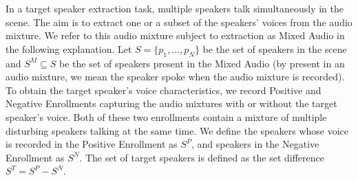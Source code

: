 




In a target speaker extraction task, multiple speakers talk simultaneously in the scene. The aim is to extract one or a subset of the speakers' voices from the audio mixture. We refer to this audio mixture subject to extraction as Mixed Audio in the following explanation. Let $S = \{p_1, ..., p_N\}$ be the set of speakers in the scene and $S^M \subseteq S$ be the set of speakers present in the Mixed Audio (by present in an audio mixture, we mean the speaker spoke when the audio mixture is recorded). To obtain the target speaker's voice characteristics, we record Positive and Negative Enrollments capturing the audio mixtures with or without the target speaker's voice. Both of these two enrollments contain a mixture of multiple disturbing speakers talking at the same time. We define the speakers whose voice is recorded in the Positive Enrollment as $S^P$, and speakers in the Negative Enrollment as $S^N$. The set of target speakers is defined as the set difference $S^T = S^P - S^N$. 



